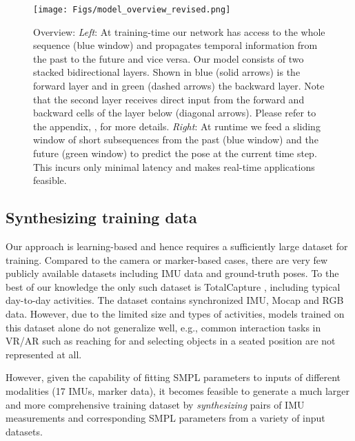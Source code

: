 \documentclass[acmtog]{acmart}
\begin{document}
\begin{figure*}
\texttt{[image: Figs/model\_overview\_revised.png]}
\caption{Overview: \emph{Left}: At training-time our network has access to the whole sequence (blue window) and propagates temporal information from the past to the future and vice versa. Our model consists of two stacked bidirectional layers. Shown in blue (solid arrows) is the forward layer and in green (dashed arrows) the backward layer. Note that the second layer receives direct input from the forward and backward cells of the layer below (diagonal arrows). Please refer to the appendix, , for more details. \emph{Right}: At runtime we feed a sliding window of short subsequences from the past (blue window) and the future (green window) to predict the pose at the current time step. This incurs only minimal latency and makes real-time applications feasible.} 
\label{fig:sipnn}
\end{figure*}\subsection{Synthesizing training data}\label{sec:synthetic_data}
Our approach is learning-based and hence requires a sufficiently large dataset for training. Compared to the camera or marker-based cases, there are very few publicly available datasets including IMU data and ground-truth poses. To the best of our knowledge the only such dataset is TotalCapture \cite{trumble2017total}, including typical day-to-day activities. The dataset contains synchronized IMU, Mocap and RGB data. However, due to the limited size and types of activities, models trained on this dataset alone do not generalize well, e.g., common interaction tasks in VR/AR such as reaching for and selecting objects in a seated position are not represented at all. 

However, given the capability of fitting SMPL parameters to inputs of different modalities (17 IMUs, marker data), it becomes feasible to generate a much larger and more comprehensive training dataset by \emph{synthesizing} pairs of IMU measurements and corresponding SMPL parameters from a variety of input datasets. 
\end{document}

